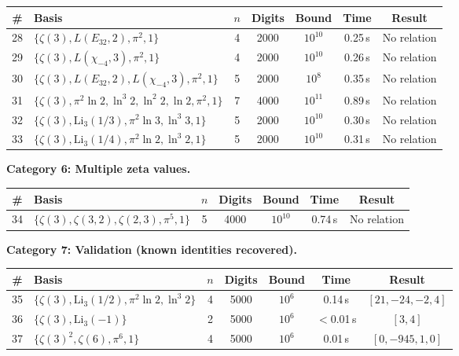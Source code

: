 \documentclass[12pt]{article}
\theoremstyle{definition}
\theoremstyle{remark}
\begin{document}
\begin{center}
\begin{tabular}{@{}clccccc@{}}
\toprule
\# & Basis & $n$ & Digits & Bound & Time & Result \\
\midrule
28 & $\{\zeta(3),L(E_{32},2),\pi^2,1\}$ & 4 & 2000 & $10^{10}$ & 0.25\,s & No relation \\
29 & $\{\zeta(3),L(\chi_{-4},3),\pi^2,1\}$ & 4 & 2000 & $10^{10}$ & 0.26\,s & No relation \\
30 & $\{\zeta(3),L(E_{32},2),L(\chi_{-4},3),\pi^2,1\}$ & 5 & 2000 & $10^{8}$ & 0.35\,s & No relation \\
31 & $\{\zeta(3),\pi^2\ln 2,\ln^{3} 2,\ln^{2} 2,\ln 2,\pi^2,1\}$ & 7 & 4000 & $10^{11}$ & 0.89\,s & No relation \\
32 & $\{\zeta(3),\mathrm{Li}_3(1/3),\pi^2\ln 3,\ln^{3} 3,1\}$ & 5 & 2000 & $10^{10}$ & 0.30\,s & No relation \\
33 & $\{\zeta(3),\mathrm{Li}_3(1/4),\pi^2\ln 2,\ln^{3} 2,1\}$ & 5 & 2000 & $10^{10}$ & 0.31\,s & No relation \\
\bottomrule
\end{tabular}
\end{center}

\medskip\noindent\textbf{Category 6: Multiple zeta values.}

\begin{center}
\begin{tabular}{@{}clccccc@{}}
\toprule
\# & Basis & $n$ & Digits & Bound & Time & Result \\
\midrule
34 & $\{\zeta(3),\zeta(3,2),\zeta(2,3),\pi^5,1\}$ & 5 & 4000 & $10^{10}$ & 0.74\,s & No relation \\
\bottomrule
\end{tabular}
\end{center}

\medskip\noindent\textbf{Category 7: Validation (known identities
recovered).}

\begin{center}
\begin{tabular}{@{}clccccc@{}}
\toprule
\# & Basis & $n$ & Digits & Bound & Time & Result \\
\midrule
35 & $\{\zeta(3),\mathrm{Li}_3(1/2),\pi^2\ln 2,\ln^{3} 2\}$ & 4 & 5000 & $10^{6}$ & 0.14\,s & $[21,-24,-2,4]$ \\
36 & $\{\zeta(3),\mathrm{Li}_3(-1)\}$ & 2 & 5000 & $10^{6}$ & $<$0.01\,s & $[3,4]$ \\
37 & $\{\zeta(3)^2,\zeta(6),\pi^6,1\}$ & 4 & 5000 & $10^{6}$ & 0.01\,s & $[0,-945,1,0]$ \\
\bottomrule
\end{tabular}
\end{center}
\end{document}
